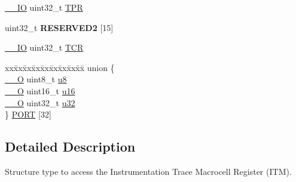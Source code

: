 \begin{DoxyCompactItemize}
\item 
\hyperlink{group___c_m_s_i_s__core__definitions_gaec43007d9998a0a0e01faede4133d6be}{\-\_\-\-\_\-\-I\-O} uint32\-\_\-t \hyperlink{struct_i_t_m___type_a72bb9b7d61fe3262cd2a6070a7bd5b69}{T\-P\-R}
\item 
\hypertarget{struct_i_t_m___type_ade93d21b11103a1e89c36b9120b4cbf0}{uint32\-\_\-t {\bfseries R\-E\-S\-E\-R\-V\-E\-D2} \mbox{[}15\mbox{]}}\label{struct_i_t_m___type_ade93d21b11103a1e89c36b9120b4cbf0}

\item 
\hyperlink{group___c_m_s_i_s__core__definitions_gaec43007d9998a0a0e01faede4133d6be}{\-\_\-\-\_\-\-I\-O} uint32\-\_\-t \hyperlink{struct_i_t_m___type_ae9dd9282fab299d0cd6e119564688e53}{T\-C\-R}
\item 
\begin{tabbing}
xx\=xx\=xx\=xx\=xx\=xx\=xx\=xx\=xx\=\kill
union \{\\
\>\hyperlink{group___c_m_s_i_s__core__definitions_ga7e25d9380f9ef903923964322e71f2f6}{\_\_O} uint8\_t \hyperlink{struct_i_t_m___type_a0374c0b98ab9de6f71fabff7412df832}{u8}\\
\>\hyperlink{group___c_m_s_i_s__core__definitions_ga7e25d9380f9ef903923964322e71f2f6}{\_\_O} uint16\_t \hyperlink{struct_i_t_m___type_ae8d499140220fa6d4eab1da7262bf08e}{u16}\\
\>\hyperlink{group___c_m_s_i_s__core__definitions_ga7e25d9380f9ef903923964322e71f2f6}{\_\_O} uint32\_t \hyperlink{struct_i_t_m___type_acaf6d0e14a3d4b541c624913b4a1931e}{u32}\\
\} \hyperlink{struct_i_t_m___type_a335fd4d241941d31cd284e0db37c381a}{PORT} \mbox{[}32\mbox{]}\\

\end{tabbing}\end{DoxyCompactItemize}


\subsection{Detailed Description}
Structure type to access the Instrumentation Trace Macrocell Register (I\-T\-M). 

